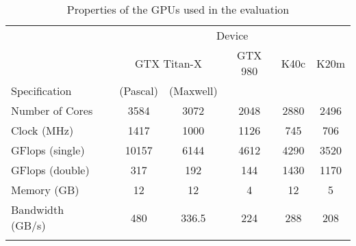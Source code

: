\begin{table}[tb]	%

%
%
%
\setlength\tabcolsep{0.4em}
\center\begin{tabular}{lc c c c c c}
                         && \multicolumn{5}{c}{Device} \\
\cline{3-7}
                && \multicolumn{2}{c}{GTX Titan-X} & GTX 980 & K40c  & K20m  \\
Specification            && (Pascal) & (Maxwell)   &         &       &       \\
\cline{1-1}\cline{3-7}
Number of Cores          && 3584     & 3072        & 2048    & 2880  & 2496  \\
Clock (MHz)              && 1417     & 1000        & 1126    & 745   & 706   \\
GFlops (single)          && 10157    & 6144        & 4612    & 4290  & 3520  \\
GFlops (double)          && 317      & 192         & 144     & 1430  & 1170  \\
Memory (GB)              && 12       & 12          & 4       & 12    & 5     \\
Bandwidth (GB/s)         && 480      & 336.5       & 224     & 288   & 208   \\
\cline{1-1}\cline{3-7}
\\[-1.5ex]
\end{tabular}
\caption{Properties of the GPUs used in the evaluation}
\label{table-gpus}
\end{table}

